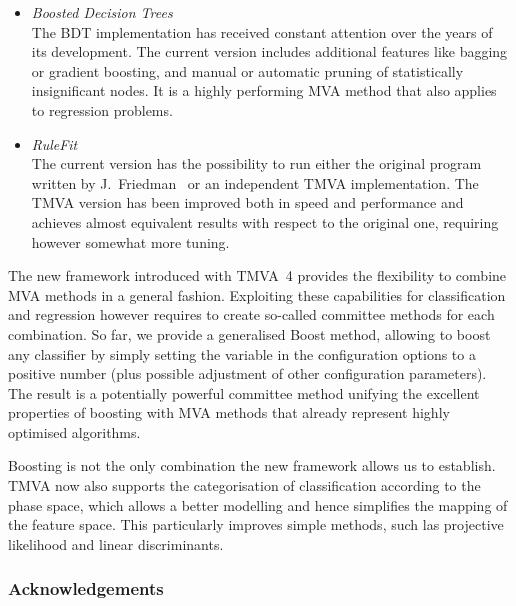 \begin{itemize}
\item {\em Boosted Decision Trees}\\
      The BDT implementation has received constant attention over the years of
      its development. The current version includes additional features like 
      bagging or gradient boosting, and manual or automatic pruning of 
      statistically insignificant nodes. It is a highly performing MVA method
      that also applies to regression problems. 

\item {\em RuleFit} \\
      The current version has the possibility to run either the original 
      program written by J.~Friedman~\cite{RuleFit} or an independent TMVA 
      implementation. The TMVA version has been improved both in speed and 
      performance and achieves almost equivalent results with respect to the 
      original one, requiring however somewhat more tuning.

\end{itemize}

The new framework introduced with TMVA~4 provides the flexibility to combine
MVA methods in a general fashion. Exploiting these capabilities for classification
and regression however requires to create so-called committee methods for each 
combination. So far, we provide a generalised Boost method, allowing to boost
any classifier by simply setting the variable  in the configuration
options to a positive number (plus possible adjustment of other configuration
parameters). The result is a potentially powerful committee method unifying
the excellent properties of boosting with MVA methods that already represent 
highly optimised algorithms. 

Boosting is not the only combination the new framework allows us to establish. 
TMVA now also supports the categorisation of classification according to
the phase space, which allows a better modelling and hence simplifies the 
mapping of the feature space. This particularly improves simple methods, such 
las projective likelihood and linear discriminants. 

\subsubsection*{Acknowledgements}
\label{sec:Acknowledgments}

